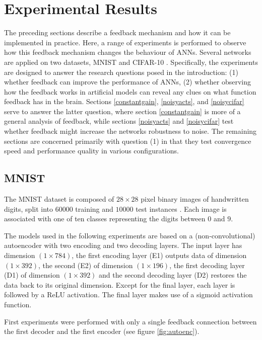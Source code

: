\documentclass{article}
\begin{document}
\section{Experimental Results}
The preceding sections describe a feedback mechanism and how it can be implemented in practice. Here, a range of experiments is performed to observe how this feedback mechanism changes the behaviour of ANNs. Several networks are applied on two datasets, MNIST \cite{lecun2010mnist} and CIFAR-10 \cite{krizhevsky2014cifar}. Specifically, the experiments are designed to answer the research questions posed in the introduction: (1) whether feedback can improve the performance of ANNs, (2) whether observing how the feedback works in artificial models can reveal any clues on what function feedback has in the brain. Sections \ref{constantgain}, \ref{noisyacts}, and \ref{noisycifar} serve to answer the latter question, where section \ref{constantgain} is more of a general analysis of feedback, while sections \ref{noisyacts} and \ref{noisycifar} test whether feedback might increase the networks robustness to noise. The remaining sections are concerned primarily with question (1) in that they test convergence speed and performance quality in various configurations. 

\subsection{MNIST}
\label{mnist}
The MNIST dataset is composed of $28 \times 28$ pixel binary images of handwritten digits, split into $60000$ training and $10000$ test instances \cite{lecun2010mnist}. Each image is associated with one of ten classes representing the digits between $0$ and $9$. 

The models used in the following experiments are based on a (non-convolutional) autoencoder with two encoding and two decoding layers. The input layer has dimension $(1\times784)$, the first encoding layer (E1) outputs data of dimension $(1\times392)$, the second (E2) of dimension $(1\times196)$, the first decoding layer (D1) of dimension $(1\times392)$ and the second decoding layer (D2) restores the data back to its original dimension. Except for the final layer, each layer is followed by a ReLU activation. The final layer makes use of a sigmoid activation function. 

First experiments were performed with only a single feedback connection between the first decoder and the first encoder (see figure \ref{fig:autoenc}). 
\end{document}
